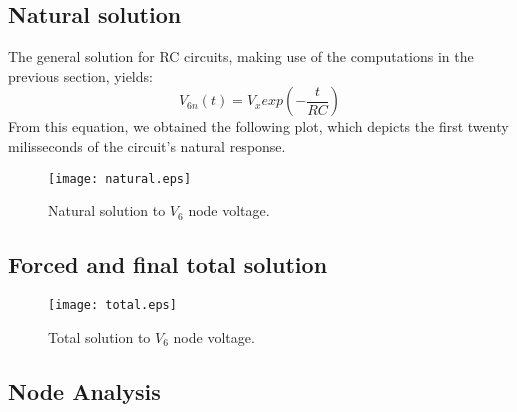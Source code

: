 \subsection{Natural solution}
The general solution for RC circuits, making use of the computations in the previous section, yields:
\begin{equation}
V_{6n}(t)=V_xexp(-\frac{t}{RC})
\end{equation}
From this equation, we obtained the following plot, which depicts the first twenty milisseconds of the circuit's natural response.
\begin{figure}[h] \centering
\texttt{[image: natural.eps]}
\caption{Natural solution to $V_{6}$ node voltage.}
\label{fig:current}
\end{figure}

\subsection{Forced and final total solution}

\begin{figure}[h] \centering
\texttt{[image: total.eps]}
\caption{Total solution to $V_{6}$ node voltage.}
\label{fig:current}
\end{figure}

\subsection{Node Analysis}

